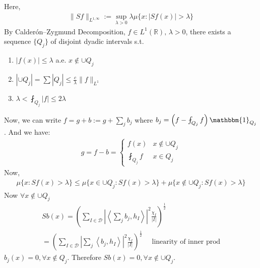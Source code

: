\documentclass{article}
\newcommand{\R}{\mathbb{R}}
\newcommand{\D}{\mathcal{D}}
\begin{document}
Here,
\begin{gather*}
    \lVert Sf \rVert_{L^{1, \infty}} := \sup_{\lambda > 0} \lambda \mu\{x : |Sf(x)| > \lambda\}
\end{gather*}
By Calderón–Zygmund Decomposition, $f\in L^1(\R), \, \lambda >0$, there exists a sequence $\{Q_j\}$ of disjoint dyadic intervals s.t.
\begin{enumerate}
    \item $|f(x)| \leq \lambda$ a.e. $x \notin \cup Q_j$
    \item $|\cup Q_j| = \sum |Q_j| \leq \frac{c}{\lambda} \lVert f \rVert_{L^1}$
    \item $\lambda < \fint_{Q_j} |f| \leq 2\lambda$
\end{enumerate}
Now, we can write $f = g + b := g + \sum_j b_j$ where $b_j = \left( f - \fint_{Q_j} f \right)\mathbbm{1}_{Q_j}$. And we have:
\begin{gather*}
    g = f - b = \begin{cases}
        f(x) & x \notin \cup Q_j\\
        \fint_{Q_j} f& x \in Q_j
    \end{cases}
\end{gather*}
Now,
\begin{gather*}
    \mu\{x: Sf(x) > \lambda\} \leq \mu\{x \in \cup Q_j: Sf(x) > \lambda\} + \mu\{x \notin \cup Q_j: Sf(x) > \lambda\}
\end{gather*}
Now $\forall x \notin \cup Q_j$
\begin{gather*}
    Sb(x) = \left( \sum_{I \in \D} \left|\left\langle \sum_j b_j, h_I \right\rangle \right|^2 \frac{\chi_I}{|I|} \right)^{\frac{1}{2}}\\
    = \left( \sum_{I \in \D} \left|\sum_j  \left\langle b_j, h_I \right\rangle \right|^2 \frac{\chi_I}{|I|} \right)^{\frac{1}{2}} \quad \text{ linearity of inner prod}
\end{gather*}
$b_j(x) = 0, \forall x \notin Q_j$. Therefore $Sb(x) = 0, \forall x \notin \cup Q_j$.
\\~
\end{document}
